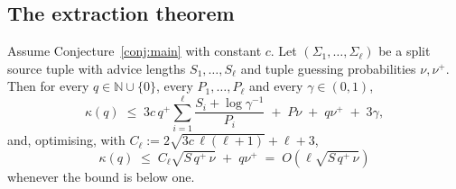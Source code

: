 \documentclass{conjura-conjecture}
\begin{document}
\subsection{The extraction theorem}\label{sec:extthm}

\begin{theorem}
\label{thm:ext}
Assume Conjecture~\ref{conj:main} with constant $c$. Let
$(\Sigma_1,\dots,\Sigma_\ell)$ be a split source tuple with advice lengths
$S_1,\dots,S_\ell$ and tuple guessing probabilities $\nu, \nu^{+}$. Then
for every $q \in \mathbb{N}\cup\{0\}$, every $P_1,\dots,P_\ell$ and every
$\gamma \in (0,1)$,
\[
  \kappa(q) \;\le\; 3c\,q^{+}\sum_{i=1}^{\ell}\frac{S_i+\log\gamma^{-1}}{P_i}
  \;+\; P\nu \;+\; q\nu^{+} \;+\; 3\gamma ,
\]
and, optimising, with $C_\ell := 2\sqrt{3c\,\ell(\ell+1)} + \ell + 3$,
\[
  \kappa(q) \;\le\; C_\ell\sqrt{S\,q^{+}\,\nu} \;+\; q\nu^{+}
  \;=\; O\!\left(\ell\sqrt{S\,q^{+}\,\nu}\right)
\]
whenever the bound is below one.
\end{theorem}
\end{document}
